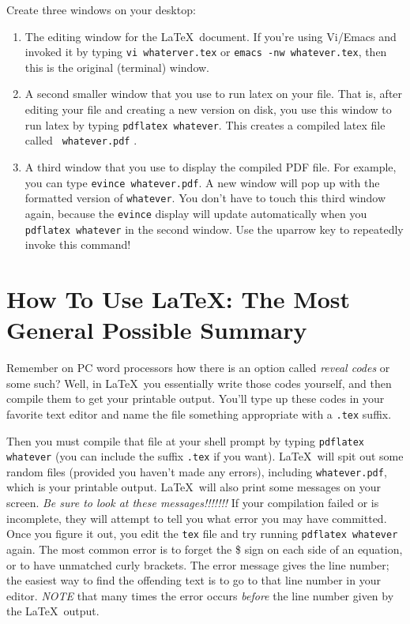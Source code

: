 \documentclass[12pt,preprint]{aastex}
\begin{document}
Create three windows on your desktop: \begin{enumerate}

\item The editing window for the \LaTeX\ document. If you're using Vi/Emacs
  and invoked it by typing {\tt vi whaterver.tex} or {\tt emacs -nw whatever.tex},
  then this is the original (terminal) window. 

\item A second smaller window that you use to run latex on your
  file. That is, after editing your file and creating a new version on
  disk, you use this window to run latex by typing {\tt pdflatex
    whatever}. This creates a compiled latex file called {\tt
    whatever.pdf} .

\item A third window that you use to display the compiled PDF file.
  For example, you can type {\tt evince whatever.pdf}. A new
  window will pop up with the formatted version of {\tt whatever}. You
  don't have to touch this third window again, because the {\tt evince}
  display will update automatically when you {\tt pdflatex whatever} in the
  second window. Use the uparrow key to repeatedly invoke this command!

\end{enumerate}

\section{How To Use \LaTeX: The Most General Possible Summary}
\label{howtosec}

        Remember on PC word processors how there is an option called
{\it reveal codes} or some such? Well, in \LaTeX\ you essentially write
those codes yourself, and then compile them to get your printable
output.  You'll type up these codes in your favorite text editor and
name the file something appropriate with a \verb&.tex& suffix.

        Then you must compile that file at your shell prompt by typing
\verb&pdflatex whatever& (you can include the suffix {\tt .tex} if you
want).  \LaTeX\ will spit out some random files (provided you haven't
made any errors), including \verb&whatever.pdf&, which is your printable
output.  \LaTeX\ will also print some messages on your screen.  {\it Be
sure to look at these messages!!!!!!!}  If your compilation failed or is incomplete, they
will attempt to tell you what error you may have committed.  Once you
figure it out, you edit the {\tt tex} file and try running {\tt pdflatex
whatever} again.  The most common error is to forget the \$ sign on each
side of an equation, or to have unmatched curly brackets.  The error
message gives the line number; the easiest way to find the offending
text is to go to that line number in your editor. {\it NOTE} that many
times the error occurs {\it before} the line number given by the \LaTeX\
output.
\end{document}

